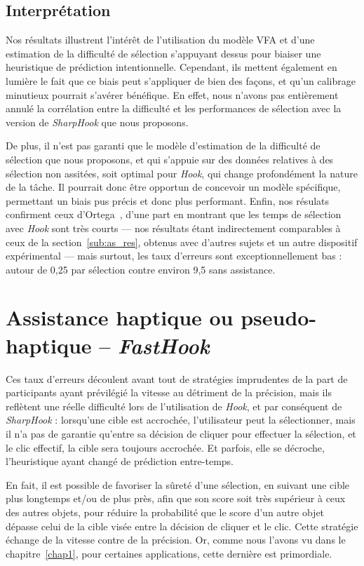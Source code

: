 	
	\subsection{Interprétation}
	Nos résultats illustrent l'intérêt de l'utilisation du modèle VFA et d'une estimation de la difficulté de sélection s'appuyant dessus pour biaiser une heuristique de prédiction intentionnelle. Cependant, ils mettent également en lumière le fait que ce biais peut s'appliquer de bien des façons, et qu'un calibrage minutieux pourrait s'avérer bénéfique. En effet, nous n'avons pas entièrement \og annulé \fg{} la corrélation entre la difficulté et les performances de sélection avec la version de \emph{SharpHook} que nous proposons.
	
	De plus, il n'est pas garanti que le modèle d'estimation de la difficulté de sélection que nous proposons, et qui s'appuie sur des données relatives à des sélection non assitées, soit optimal pour \emph{Hook}, qui change profondément la nature de la tâche. Il pourrait donc être opportun de concevoir un modèle spécifique, permettant un biais pus précis et donc plus performant. Enfin, nos résulats confirment ceux d'Ortega~\cite{ortega2013hook}, d'une part en montrant que les temps de sélection avec \emph{Hook} sont très courts --- nos résultats étant indirectement comparables à ceux de la section~\ref{sub:as_res}, obtenus avec d'autres sujets et un autre dispositif expérimental --- mais surtout, les taux d'erreurs sont exceptionnellement bas : autour de 0,25 par sélection contre environ 9,5 sans assistance.
	
	\section{Assistance haptique ou pseudo-haptique -- \emph{FastHook}}
	Ces taux d'erreurs découlent avant tout de stratégies \og imprudentes \fg{} de la part de participants ayant prévilégié la vitesse au détriment de la précision, mais ils reflètent une réelle difficulté lors de l'utilisation de \emph{Hook}, et par conséquent de \emph{SharpHook} : lorsqu'une cible est accrochée, l'utilisateur peut la sélectionner, mais il n'a pas de garantie qu'entre sa décision de cliquer pour effectuer la sélection, et le clic effectif, la cible sera toujours accrochée. Et parfois, elle se décroche, l'heuristique ayant changé de prédiction entre-temps.
	
	En fait, il est possible de favoriser la \og sûreté \fg{} d'une sélection, en suivant une cible plus longtemps et/ou de plus près, afin que son score soit très supérieur à ceux des autres objets, pour réduire la probabilité que le score d'un autre objet dépasse celui de la cible visée entre la décision de cliquer et le clic. Cette stratégie échange de la vitesse contre de la précision. Or, comme nous l'avons vu dans le chapitre~\ref{chap1}, pour certaines applications, cette dernière est primordiale.
	
